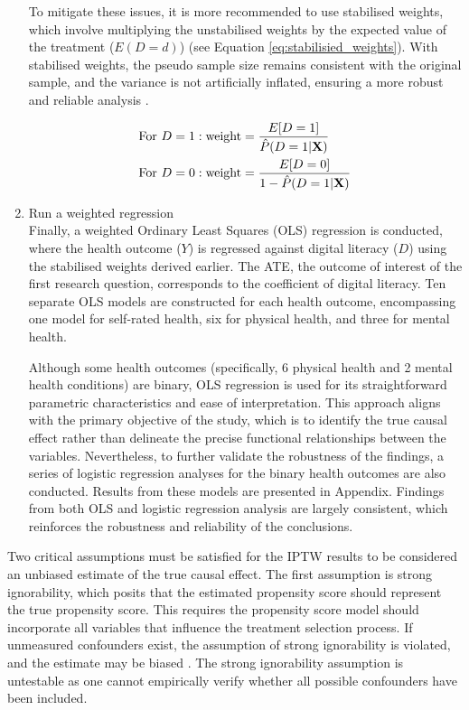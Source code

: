 \begin{enumerate}[wide=0pt, leftmargin=*, labelwidth=0pt, labelindent=\parindent, itemindent=0pt]
    To mitigate these issues, it is more recommended to use stabilised weights, which involve multiplying the unstabilised weights by the expected value of the treatment ($E(D = d)$) (see Equation \ref{eq:stabilisied_weights}). With stabilised weights, the pseudo sample size remains consistent with the original sample, and the variance is not artificially inflated, ensuring a more robust and reliable analysis \parencite[p. 413]{morgan_counterfactuals_2014}.

    \begin{equation}
        \label{eq:stabilisied_weights}
        \begin{aligned}
            \textnormal{For } D &= 1: \textnormal{weight} = \frac{E[D = 1]}{\hat{P}(D = 1 | \textbf{X})} \\
            \textnormal{For } D &= 0: \textnormal{weight} = \frac{E[D = 0]}{1 - \hat{P}(D = 1 | \textbf{X})}
        \end{aligned}
    \end{equation}

    \item Run a weighted regression \\
    Finally, a weighted Ordinary Least Squares (OLS) regression is conducted, where the health outcome ($Y$) is regressed against digital literacy ($D$) using the stabilised weights derived earlier. The ATE, the outcome of interest of the first research question, corresponds to the coefficient of digital literacy. Ten separate OLS models are constructed for each health outcome, encompassing one model for self-rated health, six for physical health, and three for mental health. 

    Although some health outcomes (specifically, 6 physical health and 2 mental health conditions) are binary, OLS regression is used for its straightforward parametric characteristics and ease of interpretation. This approach aligns with the primary objective of the study, which is to identify the true causal effect rather than delineate the precise functional relationships between the variables. Nevertheless, to further validate the robustness of the findings, a series of logistic regression analyses for the binary health outcomes are also conducted. Results from these models are presented in Appendix. Findings from both OLS and logistic regression analysis are largely consistent, which reinforces the robustness and reliability of the conclusions.
\end{enumerate}

Two critical assumptions must be satisfied for the IPTW results to be considered an unbiased estimate of the true causal effect. The first assumption is strong ignorability, which posits that the estimated propensity score should represent the true propensity score. This requires the propensity score model should incorporate all variables that influence the treatment selection process. If unmeasured confounders exist, the assumption of strong ignorability is violated, and the estimate may be biased \parencite{cole_constructing_2008}. The strong ignorability assumption is untestable as one cannot empirically verify whether all possible confounders have been included. 

